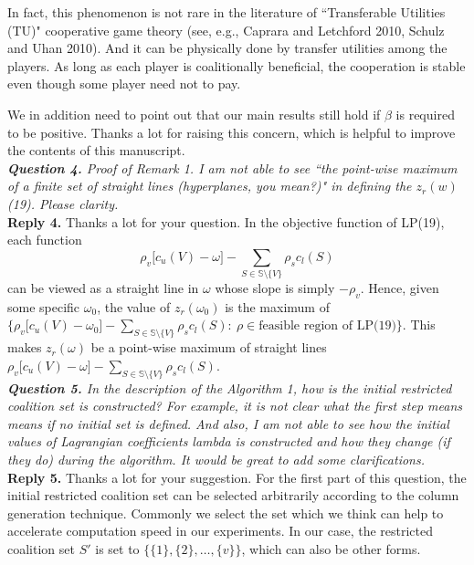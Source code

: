 \documentclass[11pt]{article}
\begin{document}
In fact, this phenomenon is not rare in the literature of ``Transferable Utilities (TU)" cooperative game theory (see, e.g., Caprara and Letchford 2010, Schulz and Uhan 2010).
And it can be physically done by transfer utilities among the players.
As long as each player is coalitionally beneficial, the cooperation is stable even though some player need not to pay.

We in addition need to point out that our main results still hold if $\beta$ is required to be positive.
Thanks a lot for raising this concern, which is helpful to improve the contents of this manuscript.
\\[4mm]
%
%
\noindent \textit{\textbf{Question 4.}
Proof of Remark 1. I am not able to see ``the point-wise maximum of a finite set of straight lines (hyperplanes, you mean?)" in defining the $z_r(w)$ (19). Please clarity.}
\\[2mm]
\noindent \textbf{Reply 4.}
Thanks a lot for your question. In the objective function of LP(19), each function
$$\rho_v \big[ c_u(V)-\omega \big] - \sum_{S \in \mathbb{S} \setminus \{V\}} \rho_s c_l(S)$$
can be viewed as a straight line in $\omega$ whose slope is simply $-\rho_v$.
Hence, given some specific $\omega_0$, the value of $z_r(\omega_0)$ is the maximum of $\big\{\rho_v \big[ c_u(V)-\omega_0 \big] - \sum_{S \in \mathbb{S} \setminus \{V\}} \rho_s c_l(S):~\rho \in \text{feasible region of LP(19)} \big\}$.
This makes $z_r(\omega)$ be a point-wise maximum of straight lines $\rho_v \big[ c_u(V)-\omega \big] - \sum_{S \in \mathbb{S} \setminus \{V\}} \rho_s c_l(S)$.
\\[4mm]
%
%
%
\noindent \textit{\textbf{Question 5.}
In the description of the Algorithm 1, how is the initial restricted coalition set is constructed? For example, it is not clear what the first step means means if no initial set is defined. And also, I am not able to see how the initial values of Lagrangian coefficients lambda is constructed and how they change (if they do) during the algorithm. It would be great to add some clarifications.}
~\\[2mm]
\noindent \textbf{Reply 5.}
Thanks a lot for your suggestion. For the first part of this question, the initial restricted coalition set can be selected arbitrarily according to the column generation technique. Commonly we select the set which we think can help to accelerate computation speed in our experiments. In our case, the restricted coalition set $S'$ is set to $\{\{1\},\{2\},\ldots, \{v\}\}$, which can also be other forms.
\end{document}
